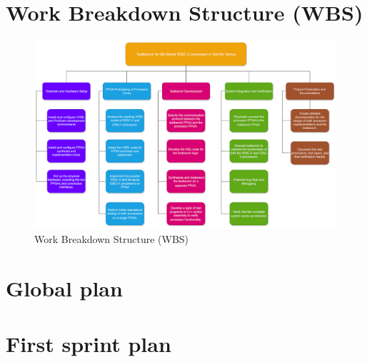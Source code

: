 \documentclass[10pt,twocolumn]{article}
\begin{document}
\FloatBarrier
\section{Work Breakdown Structure (WBS)}
\begin{figure}[t]
\centering
\includegraphics[width=\linewidth]{WBS.png}
\caption{Work Breakdown Structure (WBS)}
\label{fig:timeline}
\end{figure}

\section{Global plan}
\subsection{}
\section{First sprint plan}
\end{document}
